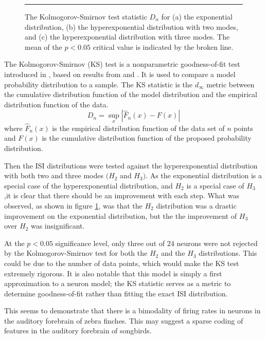 \begin{figure}

\bigskip
\rule{35em}{0.5pt}
\caption{\label{exphehe3} The Kolmogorov-Smirnov test statistic $D_n$ for (a) the exponential distribution, (b) the hyperexponential distribution with two modes, and (c) the hyperexponential distribution with three modes.  The mean of the $p<0.05$ critical value is indicated by the broken line.}
\end{figure}

The Kolmogorov-Smirnov (KS) test is a nonparametric goodness-of-fit test introduced in \citep{Massey1951a}, based on results from \citet{Kolmogorov1933a} and \citet{Smirnoff1939a}.  It is used to compare a model probability distribution to a sample.  The KS statistic is the $d_{\infty}$ metric between the cumulative distribution function of the model distribution and the empirical distribution function of the data.
\begin{equation}
D_n = \sup_x \left| \hat{F}_n(x) - F(x) \right|
\end{equation}
where $\hat{F}_n(x)$ is the empirical distribution function of the data set of $n$ points and $F(x)$ is the cumulative distribution function of the proposed probability distribution.

Then the ISI distributions were tested against the hyperexponential distribution with both two and three modes $(H_2$ and $H_3)$.  As the exponential distribution is a special case of the hyperexponential distribution, and $H_2$ is a special case of $H_3$ ,it is clear that there should be an improvement with each step.  What was observed, as shown in figure \ref{exphehe3}, was that the $H_2$ distribution was a drastic improvement on the exponential distribution, but the the improvement of $H_3$ over $H_2$ was insignificant. 


At the $p<0.05$ significance level, only three out of $24$ neurons were not rejected by the Kolmogorov-Smirnov test for both the $H_2$ and the $H_3$ distributions. This could be due to the number of data points, which would make the KS test extremely rigorous.  It is also notable that this model is simply a first approximation to a neuron model; the KS statistic serves as a metric to determine goodness-of-fit rather than fitting the exact ISI distribution.

This seems to demonstrate that there is a bimodality of firing rates in neurons in the auditory forebrain of zebra finches.  This may suggest a sparse coding of features in the auditory forebrain of songbirds.  

